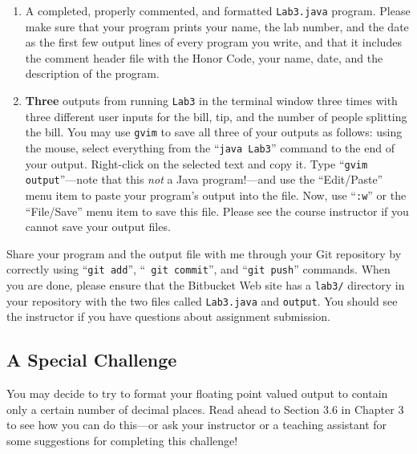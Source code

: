 \begin{enumerate}

        \item A completed, properly commented, and formatted {\tt Lab3.java} program. Please make sure that your program
          prints your name, the lab number, and the date as the first few output lines of every program you write, and
          that it includes the comment header file with the Honor Code, your name, date, and the description of the
          program.

        \item \textbf{Three} outputs from running {\tt Lab3} in the terminal window three times with three different
          user inputs for the bill, tip, and the number of people splitting the bill. You may use {\tt gvim} to save all
          three of your outputs as follows: using the mouse, select everything from the ``{\tt java Lab3}'' command to
          the end of your output.  Right-click on the selected text and copy it.  Type ``{\tt gvim output}''---note that
          this {\em not} a Java program!---and use the ``Edit/Paste'' menu item to paste your program's output into the
          file.  Now, use ``{\tt :w}'' or the ``File/Save'' menu item to save this file. Please see the course
          instructor if you cannot save your output files.

\end{enumerate}
\vspace{-0.1in}
Share your program and the output file with me through your Git repository by correctly using ``{\tt git add}'', ``{\tt
git commit}'', and ``{\tt git push}'' commands. When you are done, please ensure that the Bitbucket Web site has
a {\tt lab3/} directory in your repository with the two files called {\tt Lab3.java} and {\tt output}. You should see 
the instructor if you have questions about assignment submission.

\vspace{-0.1in}
\subsection*{A Special Challenge}

You may decide to try to format your floating point valued output to contain only a certain number of decimal places.
Read ahead to Section 3.6 in Chapter 3 to see how you can do this---or ask your instructor or a teaching assistant for
some suggestions for completing this challenge!


